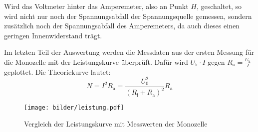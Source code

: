 Wird das Voltmeter hinter das Amperemeter, also an Punkt $H$, geschaltet, so wird
nicht nur noch der Spannungsabfall der Spannungsquelle gemessen, sondern zusätzlich
noch der Spannungsabfall des Amperemeters, da auch dieses einen geringen Innenwiderstand
trägt.

Im letzten Teil der Auswertung werden die Messdaten aus der ersten Messung für die Monozelle
mit der Leistungskurve überprüft. Dafür wird $U_\text{k} \cdot I$ gegen $R_\text{a} = \frac{U_\text{k}}{I}$
geplottet. Die Theoriekurve lautet:
\begin{equation}
  N = I^2 R_\text{a} = \frac{U_\text{0}^2}{(R_\text{i}+ R_\text{a})^2} R_\text{a}
\end{equation}

\begin{figure}[!h]
  \centering
  \texttt{[image: bilder/leistung.pdf]}
  \caption{Vergleich der Leistungskurve mit Messwerten der Monozelle}
  \label{fig:leistung}
\end{figure}

